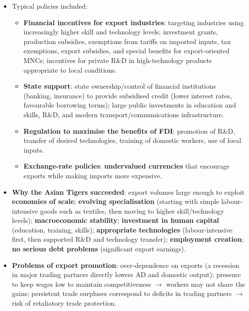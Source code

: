 \documentclass[a4paper,12pt]{article}
\begin{document}
\begin{itemize}
  \item Typical policies included:
  \begin{itemize}
    \item \textbf{Financial incentives for export industries}: targeting industries using increasingly higher skill and technology levels; investment grants, production subsidies, exemptions from tariffs on imported inputs, tax exemptions, export subsidies, and special benefits for export-oriented MNCs; incentives for private R\&D in high-technology products appropriate to local conditions.
    \item \textbf{State support}: state ownership/control of financial institutions (banking, insurance) to provide subsidised credit (lower interest rates, favourable borrowing terms); large public investments in education and skills, R\&D, and modern transport/communications infrastructure.
    \item \textbf{Regulation to maximise the benefits of FDI}: promotion of R\&D, transfer of desired technologies, training of domestic workers, use of local inputs.
    \item \textbf{Exchange-rate policies}: \textbf{undervalued currencies} that encourage exports while making imports more expensive.
  \end{itemize}
  \item \textbf{Why the Asian Tigers succeeded}: export volumes large enough to exploit \textbf{economies of scale}; \textbf{evolving specialisation} (starting with simple labour-intensive goods such as textiles, then moving to higher skill/technology levels); \textbf{macroeconomic stability}; \textbf{investment in human capital} (education, training, skills); \textbf{appropriate technologies} (labour-intensive first, then supported R\&D and technology transfer); \textbf{employment creation}; \textbf{no serious debt problems} (significant export earnings).
  \item \textbf{Problems of export promotion}: over-dependence on exports (a recession in major trading partners directly lowers AD and domestic output); pressure to keep wages low to maintain competitiveness $\to$ workers may not share the gains; persistent trade surpluses correspond to deficits in trading partners $\to$ risk of retaliatory trade protection.
\end{itemize}
\end{document}
